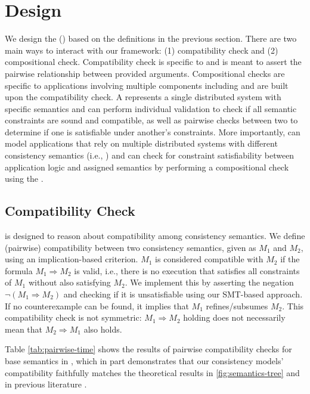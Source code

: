 \section{\sysname{} Design}
\label{sec:usage}

We design the \sysmodlong{} (\sysmod{}) based on the definitions in
the previous section. There are two main ways to interact with our framework:
(1) compatibility check and (2) compositional check. Compatibility check is specific
to \sysmods and is meant to assert the pairwise relationship between provided
arguments. Compositional checks are specific to applications involving
multiple components including \sysmods{} and are
built upon the compatibility check.
A \sysmod{} represents a single distributed system with specific semantics
and \sysname{} can perform individual \sysmod{} validation to check if all
semantic constraints are sound and compatible, as
well as pairwise checks between two \sysmods{} to determine if one
is satisfiable under another's constraints.
More importantly, \sysname{} can model applications that rely on multiple
distributed systems with different
consistency semantics (i.e., \sysmods{}) and can check for constraint satisfiability
between application logic and assigned semantics by performing a
compositional check using the \sysgraph{}.

\subsection{Compatibility Check}

\sysname{} is designed to reason about
compatibility among consistency semantics.
We define (pairwise) compatibility between two consistency semantics, given as \sysmods{}
$M_1$ and $M_2$, using
an implication-based criterion. $M_1$ is considered compatible with
$M_2$ if the formula $M_1 \Rightarrow M_2$ is valid, i.e., there is no
execution that satisfies all constraints of $M_1$ without also
satisfying $M_2$.
We implement this by asserting the negation $\neg (M_1 \Rightarrow M_2)$ and
checking if it is unsatisfiable using our SMT-based approach. If no
counterexample can be found, it implies that $M_1$
refines/subsumes $M_2$. This compatibility check is not symmetric:
$M_1 \Rightarrow M_2$
holding does not necessarily mean that $M_2 \Rightarrow M_1$ also holds.

Table \ref{tab:pairwise-time} shows the results of pairwise
compatibility checks for
base semantics in \sysname{}, which in part demonstrates that our consistency
models' compatibility faithfully matches the theoretical results
in \cref{fig:semantics-tree} and in previous literature \cite{terry1994session}.

